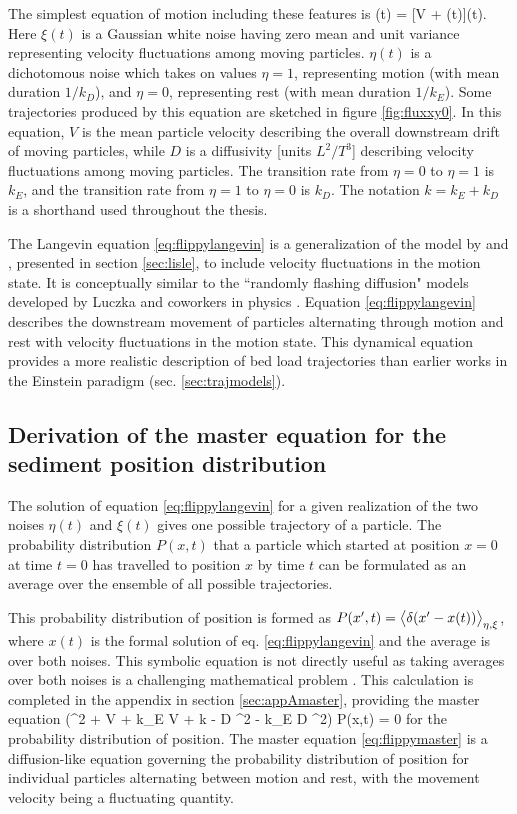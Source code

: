 The simplest equation of motion including these features is
\be {}(t) = [V + \xi(t)]\eta(t).  \label{eq:flippylangevin} \ee
Here $\xi(t)$ is a Gaussian white noise having zero mean and unit variance representing velocity fluctuations among moving particles. $\eta(t)$ is a dichotomous noise which takes on values $\eta = 1$, representing motion (with mean duration $1/k_D$), and $\eta=0$, representing rest (with mean duration $1/k_E$).
Some trajectories produced by this equation are sketched in figure \ref{fig:fluxxy0}. In this equation, $V$ is the mean particle velocity describing the overall downstream drift of moving particles, while $D$ is a diffusivity [units $L^2/T^3$] describing velocity fluctuations among moving particles.
The transition rate from $\eta=0$ to $\eta = 1$ is $k_E$, and the transition rate from $\eta=1$ to $\eta= 0$ is $k_D$. The notation $k=k_E+k_D$ is a shorthand used throughout the thesis.

The Langevin equation \ref{eq:flippylangevin} is a generalization of the model by \citet{Lisle1998} and \citet{Lajeunesse2017}, presented in section \ref{sec:lisle}, to include velocity fluctuations in the motion state.
It is conceptually similar to the ``randomly flashing diffusion" models developed by Luczka and coworkers in physics \citep{Luczka1992,Luczka1993,Luczka1995}.
Equation \ref{eq:flippylangevin} describes the downstream movement of particles alternating through motion and rest with velocity fluctuations in the motion state. This dynamical equation provides a more realistic description of bed load trajectories than earlier works in the Einstein paradigm (sec. \ref{sec:trajmodels}).

\subsection{Derivation of the master equation for the sediment position distribution}
\label{sec:floppymastereq}
The solution of equation \ref{eq:flippylangevin} for a given realization of the two noises $\eta(t)$ and $\xi(t)$ gives one possible trajectory of a particle. The probability distribution $P(x,t)$ that a particle which started at position $x=0$ at time $t=0$ has travelled to position $x$ by time $t$ can be formulated as an average over the ensemble of all possible trajectories.

This probability distribution of position is formed as $ P(x',t) = \big\langle \delta(x'-x(t))\big\rangle_{\eta,\xi} $, where $x(t)$ is the formal solution of eq. \ref{eq:flippylangevin} and the average is over both noises.
This symbolic equation is not directly useful as taking averages over both noises is a challenging mathematical problem \citep{Hanggi1978}. This calculation is completed in the appendix in section \ref{sec:appAmaster}, providing the master equation
\be (\pt^2 + V \px \pt + k_E V \px + k \pt - D \px^2 \pt - k_E D \px^2) P(x,t) = 0 \label{eq:flippymaster}\ee
for the probability distribution of position.
The master equation \ref{eq:flippymaster} is a diffusion-like equation governing the probability distribution of position for individual particles alternating between motion and rest, with the movement velocity being a fluctuating quantity.

